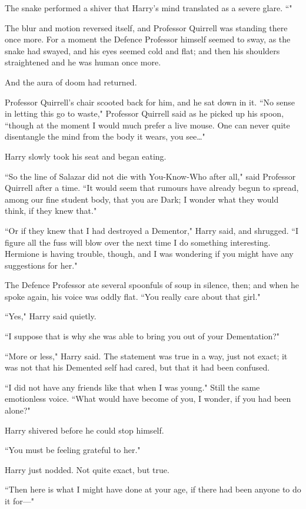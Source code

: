 The snake performed a shiver that Harry's mind translated as a severe glare. ``"

The blur and motion reversed itself, and Professor Quirrell was standing there once more. For a moment the Defence Professor himself seemed to sway, as the snake had swayed, and his eyes seemed cold and flat; and then his shoulders straightened and he was human once more.

And the aura of doom had returned.

Professor Quirrell's chair scooted back for him, and he sat down in it. ``No sense in letting this go to waste," Professor Quirrell said as he picked up his spoon, ``though at the moment I would much prefer a live mouse. One can never quite disentangle the mind from the body it wears, you see{\ldots}"

Harry slowly took his seat and began eating.

\later

``So the line of Salazar did not die with You-Know-Who after all," said Professor Quirrell after a time. ``It would seem that rumours have already begun to spread, among our fine student body, that you are Dark; I wonder what they would think, if they knew that."

``Or if they knew that I had destroyed a Dementor," Harry said, and shrugged. ``I figure all the fuss will blow over the next time I do something interesting. Hermione is having trouble, though, and I was wondering if you might have any suggestions for her."

The Defence Professor ate several spoonfuls of soup in silence, then; and when he spoke again, his voice was oddly flat. ``You really care about that girl."

``Yes," Harry said quietly.

``I suppose that is why she was able to bring you out of your Dementation?"

``More or less," Harry said. The statement was true in a way, just not exact; it was not that his Demented self had cared, but that it had been confused.

``I did not have any friends like that when I was young." Still the same emotionless voice. ``What would have become of you, I wonder, if you had been alone?"

Harry shivered before he could stop himself.

``You must be feeling grateful to her."

Harry just nodded. Not quite exact, but true.

``Then here is what I might have done at your age, if there had been anyone to do it for—"


